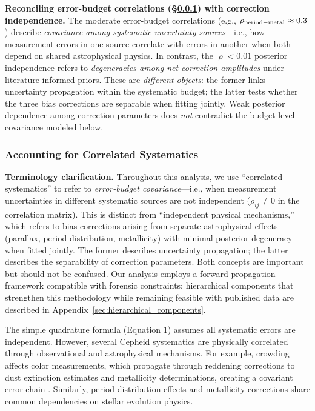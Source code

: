 \documentclass[preprint, linenumbers]{aastex701}
\begin{document}
\textbf{Reconciling error-budget correlations (\S\ref{sec:methods_correlations}) with correction independence.} The moderate error-budget correlations (e.g., $\rho_{\rm period-metal} \approx 0.3$) describe \textit{covariance among systematic uncertainty sources}---i.e., how measurement errors in one source correlate with errors in another when both depend on shared astrophysical physics. In contrast, the $|\rho| < 0.01$ posterior independence refers to \textit{degeneracies among net correction amplitudes} under literature-informed priors. These are \textit{different objects}: the former links uncertainty propagation within the systematic budget; the latter tests whether the three bias corrections are separable when fitting jointly. Weak posterior dependence among correction parameters does \textit{not} contradict the budget-level covariance modeled below.

\subsubsection{Accounting for Correlated Systematics} \label{sec:methods_correlations}

\textbf{Terminology clarification.} Throughout this analysis, we use ``correlated systematics'' to refer to \textit{error-budget covariance}---i.e., when measurement uncertainties in different systematic sources are not independent ($\rho_{ij} \neq 0$ in the correlation matrix). This is distinct from ``independent physical mechanisms,'' which refers to bias corrections arising from separate astrophysical effects (parallax, period distribution, metallicity) with minimal posterior degeneracy when fitted jointly. The former describes uncertainty propagation; the latter describes the separability of correction parameters. Both concepts are important but should not be confused. Our analysis employs a forward-propagation framework compatible with forensic constraints; hierarchical components that strengthen this methodology while remaining feasible with published data are described in Appendix~\ref{sec:hierarchical_components}.

The simple quadrature formula (Equation 1) assumes all systematic errors are independent. However, several Cepheid systematics are physically correlated through observational and astrophysical mechanisms. For example, crowding affects color measurements, which propagate through reddening corrections to dust extinction estimates and metallicity determinations, creating a covariant error chain \citep{Freedman2025a}. Similarly, period distribution effects and metallicity corrections share common dependencies on stellar evolution physics.
\end{document}
